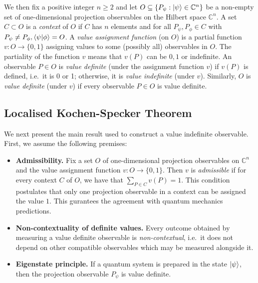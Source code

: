 \documentclass[11pt,a4paper]{article}
\begin{document}
We then fix a positive integer $n\geq 2$ and let $O \subseteq \{  P_{\psi}:  \ket{\psi} \in \mathbb{C}^{n} \}$ be a non-empty set of one-dimensional projection observables on the Hilbert space $\mathbb{C}^{n}$.
A set $C \subset O$ is a {\it  context} of $O$ if $C$ has $n$ elements and for all $P_{\psi}, P_{\phi} \in C$ with $P_{\psi} \neq P_{\phi}, \braket{\psi}{\phi} = O$.
A  {\it  value assignment function} (on $O$) is a partial function $v:O\to \{0,1\}$ assigning values to some (possibly all) observables in $O$.  The partiality of the  function $v$ means that $v(P)$ can be $0,1$ or indefinite.
An observable $P \in O$ is  {\it  value definite} (under the assignment function $v$)  if $v(P)$ is defined, i.e.~it is 0 or 1; otherwise, it is  {\it  value indefinite} (under $v$). Similarly, $O$ is {\it  value definite} (under $v$) if every observable $P \in O$ is value definite.



\subsection{Localised Kochen-Specker Theorem}
We next present the main result used to construct a value indefinite observable. First, we assume  the following  premises:

\begin{itemize}
\item {\bf Admissibility.} Fix a set $O$  of one-dimensional projection observables on $\mathbb{C}^{n}$ and the value assignment function $v:O\rightarrow \{0,1\}$. Then $v$ is  {\it  admissible} if for  every context $C$ of $O$, we have that $\sum_{P\in C}v(P) = 1$.
This condition postulates that only one projection observable in a context can be assigned the value $1$. This gurantees the agreement with quantum mechanics predictions.



\item {\bf Non-contextuality of definite values.}  Every outcome obtained by
measuring a value definite observable
 is {\it  non-contextual}, i.e.\ it does not
depend on other compatible
 observables which may be measured alongside it.
 \item{\bf Eigenstate principle.}  If a quantum system is prepared in the
state $\ket{\psi}$, then the projection observable
$P_\psi$ is value definite.
\end{itemize}
\end{document}
